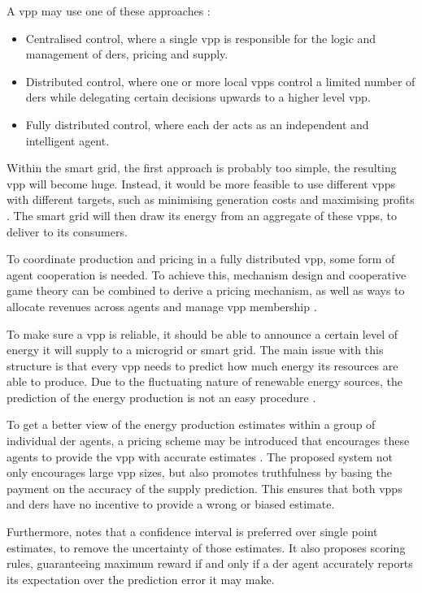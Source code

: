 A \ac{vpp} may use one of these approaches \cite{NikonowiczMilewski2012}:
\begin{itemize}
	\item Centralised control, where a single \ac{vpp} is responsible for the logic and management of \acp{der}, pricing and supply.
	\item Distributed control, where one or more local \acp{vpp} control a limited number of \acp{der} while delegating certain decisions upwards to a higher level \ac{vpp}.
	\item Fully distributed control, where each \ac{der} acts as an independent and intelligent agent.
\end{itemize}

Within the smart grid, the first approach is probably too simple, the resulting \ac{vpp} will become huge. Instead, it would be more feasible to use different \acp{vpp} with different targets, such as minimising generation costs and maximising profits \cite{LombardiPowalkoRudion2009}. The smart grid will then draw its energy from an aggregate of these \acp{vpp}, to deliver to its consumers. 

To coordinate production and pricing in a fully distributed \ac{vpp}, some form of agent cooperation is needed. To achieve this, mechanism design and cooperative game theory can be combined to derive a pricing mechanism, as well as ways to allocate revenues across agents and manage \ac{vpp} membership \cite{ChalkiadakisRobuKotaEtAl2011}. 

To make sure a \ac{vpp} is reliable, it should be able to announce a certain level of energy it will supply to a microgrid or smart grid. The main issue with this structure is that every \ac{vpp} needs to predict how much energy its resources are able to produce. Due to the fluctuating nature of renewable energy sources, the prediction of the energy production is not an easy procedure \cite{LombardiPowalkoRudion2009}.  

To get a better view of the energy production estimates within a group of individual \ac{der} agents, a pricing scheme may be introduced that encourages these agents to provide the \ac{vpp} with accurate estimates \cite{ChalkiadakisRobuKotaEtAl2011}. The proposed system not only encourages large \ac{vpp} sizes, but also promotes truthfulness by basing the payment on the accuracy of the supply prediction. This ensures that both \acp{vpp} and \acp{der} have no incentive to provide a wrong or biased estimate.

Furthermore, \cite{RobuKotaChalkiadakisEtAl2012} notes that a confidence interval is preferred over single point estimates, to remove the uncertainty of those estimates. It also proposes scoring rules, guaranteeing maximum reward if and only if a \ac{der} agent accurately reports its expectation over the prediction error it may make.  

